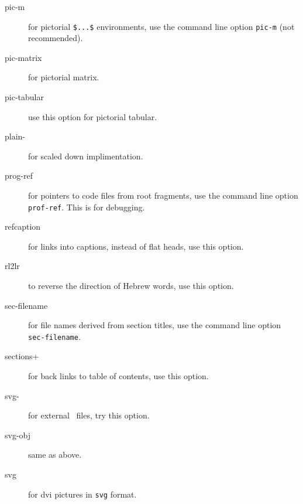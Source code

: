 \begin{description}
\item[pic-m] for pictorial \verb=$...$= environments, use the command
  line option \verb=pic-m= (not recommended).

\item[pic-matrix] for pictorial matrix.




\item[pic-tabular] use this option for pictorial tabular.

\item[plain-] for scaled down implimentation.




\item[prog-ref] for pointers to code files from root fragments, use
  the command line option \verb=prof-ref=. This is for debugging.

\item[refcaption] for links into captions, instead of flat heads, use
  this option.

\item[rl2lr] to reverse the direction of Hebrew words, use this
  option.

\item[sec-filename] for file names derived from section titles, use
  the command line option \verb=sec-filename=.

\item[sections+] for back links to table of contents, use this option.


\item[svg-] for external \svg\ files, try this option.

\item[svg-obj] same as above.

\item[svg] for dvi pictures in \verb=svg= format.


\end{description}
